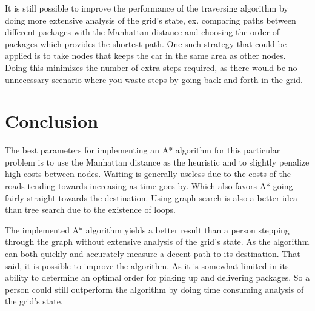 \documentclass[12pt, a4paper]{article}
\begin{document}
It is still possible to improve the performance of the traversing algorithm by doing more extensive analysis of the grid's state, ex. comparing paths between different packages with the Manhattan distance and choosing the order of packages which provides the shortest path. One such strategy that could be applied is to take nodes that keeps the car in the same area as other nodes. Doing this minimizes the number of extra steps required, as there would be no unnecessary scenario where you waste steps by going back and forth in the grid.

\section{Conclusion}

The best parameters for implementing an A* algorithm for this particular problem is to use the Manhattan distance as the heuristic and to slightly penalize high costs between nodes. Waiting is generally useless due to the costs of the roads tending towards increasing as time goes by. Which also favors A* going fairly straight towards the destination. Using graph search is also a better idea than tree search due to the existence of loops.

The implemented A* algorithm yields a better result than a person stepping through the graph without extensive analysis of the grid's state. As the algorithm can both quickly and accurately measure a decent path to its destination. That said, it is possible to improve the algorithm. As it is somewhat limited in its ability to determine an optimal order for picking up and delivering packages. So a person could still outperform the algorithm by doing time consuming analysis of the grid's state.
\end{document}

